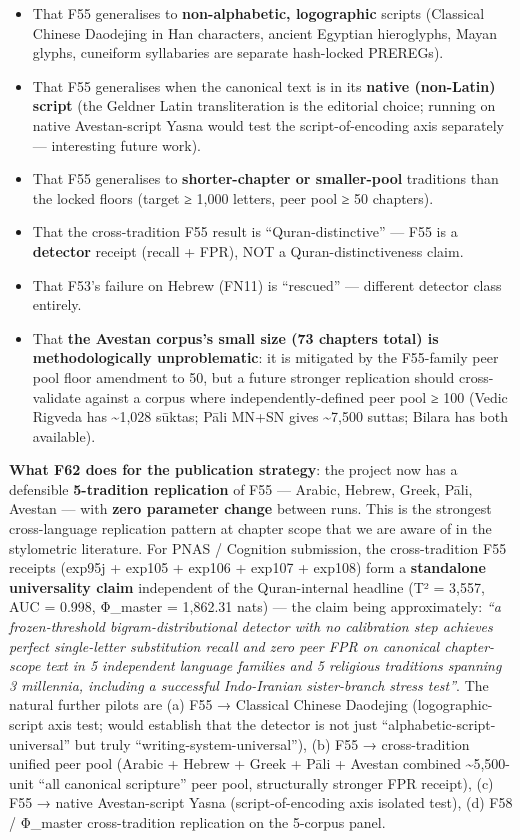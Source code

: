 \documentclass[
]{article}
\providecommand{\tightlist}{%
  \setlength{\itemsep}{0pt}\setlength{\parskip}{0pt}}
\begin{document}
\begin{itemize}
\tightlist
\item
  That F55 generalises to \textbf{non-alphabetic, logographic} scripts
  (Classical Chinese Daodejing in Han characters, ancient Egyptian
  hieroglyphs, Mayan glyphs, cuneiform syllabaries are separate
  hash-locked PREREGs).
\item
  That F55 generalises when the canonical text is in its \textbf{native
  (non-Latin) script} (the Geldner Latin transliteration is the
  editorial choice; running on native Avestan-script Yasna would test
  the script-of-encoding axis separately --- interesting future work).
\item
  That F55 generalises to \textbf{shorter-chapter or smaller-pool}
  traditions than the locked floors (target ≥ 1,000 letters, peer pool ≥
  50 chapters).
\item
  That the cross-tradition F55 result is ``Quran-distinctive'' --- F55
  is a \textbf{detector} receipt (recall + FPR), NOT a
  Quran-distinctiveness claim.
\item
  That F53's failure on Hebrew (FN11) is ``rescued'' --- different
  detector class entirely.
\item
  That \textbf{the Avestan corpus's small size (73 chapters total) is
  methodologically unproblematic}: it is mitigated by the F55-family
  peer pool floor amendment to 50, but a future stronger replication
  should cross-validate against a corpus where independently-defined
  peer pool ≥ 100 (Vedic Rigveda has \textasciitilde1,028 sūktas; Pāli
  MN+SN gives \textasciitilde7,500 suttas; Bilara has both available).
\end{itemize}

\textbf{What F62 does for the publication strategy}: the project now has
a defensible \textbf{5-tradition replication} of F55 --- Arabic, Hebrew,
Greek, Pāli, Avestan --- with \textbf{zero parameter change} between
runs. This is the strongest cross-language replication pattern at
chapter scope that we are aware of in the stylometric literature. For
PNAS / Cognition submission, the cross-tradition F55 receipts (exp95j +
exp105 + exp106 + exp107 + exp108) form a \textbf{standalone
universality claim} independent of the Quran-internal headline (T² =
3,557, AUC = 0.998, Φ\_master = 1,862.31 nats) --- the claim being
approximately: \emph{``a frozen-threshold bigram-distributional detector
with no calibration step achieves perfect single-letter substitution
recall and zero peer FPR on canonical chapter-scope text in 5
independent language families and 5 religious traditions spanning 3
millennia, including a successful Indo-Iranian sister-branch stress
test''}. The natural further pilots are (a) F55 → Classical Chinese
Daodejing (logographic-script axis test; would establish that the
detector is not just ``alphabetic-script-universal'' but truly
``writing-system-universal''), (b) F55 → cross-tradition unified peer
pool (Arabic + Hebrew + Greek + Pāli + Avestan combined
\textasciitilde5,500-unit ``all canonical scripture'' peer pool,
structurally stronger FPR receipt), (c) F55 → native Avestan-script
Yasna (script-of-encoding axis isolated test), (d) F58 / Φ\_master
cross-tradition replication on the 5-corpus panel.
\end{document}
